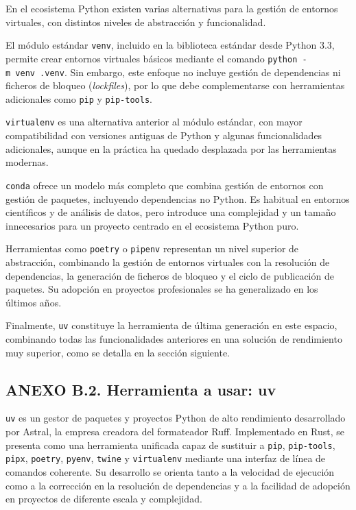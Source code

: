 En el ecosistema Python existen varias alternativas para la gestión de
entornos virtuales, con distintos niveles de abstracción y
funcionalidad.

El módulo estándar \texttt{venv}, incluido en la biblioteca estándar
desde Python 3.3, permite crear entornos virtuales básicos mediante el
comando \texttt{python\ -m\ venv\ .venv}. Sin embargo, este enfoque no
incluye gestión de dependencias ni ficheros de bloqueo
(\emph{lockfiles}), por lo que debe complementarse con herramientas
adicionales como \texttt{pip} y \texttt{pip-tools}.

\texttt{virtualenv} es una alternativa anterior al módulo estándar, con
mayor compatibilidad con versiones antiguas de Python y algunas
funcionalidades adicionales, aunque en la práctica ha quedado desplazada
por las herramientas modernas.

\texttt{conda} ofrece un modelo más completo que combina gestión de
entornos con gestión de paquetes, incluyendo dependencias no Python. Es
habitual en entornos científicos y de análisis de datos, pero introduce
una complejidad y un tamaño innecesarios para un proyecto centrado en el
ecosistema Python puro.

Herramientas como \texttt{poetry} o \texttt{pipenv} representan un nivel
superior de abstracción, combinando la gestión de entornos virtuales con
la resolución de dependencias, la generación de ficheros de bloqueo y el
ciclo de publicación de paquetes. Su adopción en proyectos profesionales
se ha generalizado en los últimos años.

Finalmente, \texttt{uv} constituye la herramienta de última generación
en este espacio, combinando todas las funcionalidades anteriores en una
solución de rendimiento muy superior, como se detalla en la sección
siguiente.

\subsection{ANEXO B.2. Herramienta a usar:
uv}\label{anexo-b.2.-herramienta-a-usar-uv}

\texttt{uv} es un gestor de paquetes y proyectos Python de alto
rendimiento desarrollado por Astral, la empresa creadora del formateador
Ruff. Implementado en Rust, se presenta como una herramienta unificada
capaz de sustituir a \texttt{pip}, \texttt{pip-tools}, \texttt{pipx},
\texttt{poetry}, \texttt{pyenv}, \texttt{twine} y \texttt{virtualenv}
mediante una interfaz de línea de comandos coherente. Su desarrollo se
orienta tanto a la velocidad de ejecución como a la corrección en la
resolución de dependencias y a la facilidad de adopción en proyectos de
diferente escala y complejidad.

